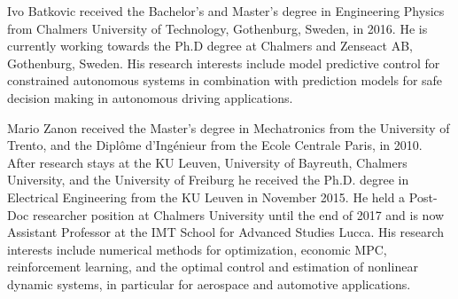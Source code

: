 \documentclass[journal]{IEEEtran}
\begin{document}
	
	
	\begin{IEEEbiography}{Ivo Batkovic}
		received the Bachelor's and Master's degree in Engineering Physics from Chalmers University of Technology, Gothenburg, Sweden, in 2016. He is currently working towards the Ph.D degree at Chalmers and Zenseact AB, Gothenburg, Sweden. His research interests include model predictive control for constrained autonomous systems in combination with prediction models for safe decision making in autonomous driving applications.
	\end{IEEEbiography}

	\begin{IEEEbiography}{Mario Zanon}
		received the Master's degree in Mechatronics from the University of Trento, and the Dipl\^{o}me d'Ing\'{e}nieur from the Ecole Centrale Paris, in 2010. After research stays at the KU Leuven, University of Bayreuth, Chalmers University, and the University of Freiburg he received the Ph.D. degree in Electrical Engineering from the KU Leuven in November 2015. He held a Post-Doc researcher position at Chalmers University until the end of 2017 and is now Assistant Professor at the IMT School for Advanced Studies Lucca. His research interests include numerical methods for optimization, economic MPC, reinforcement learning, and the optimal control and estimation of nonlinear dynamic systems, in particular for aerospace and automotive applications.
	\end{IEEEbiography}
\end{document}
